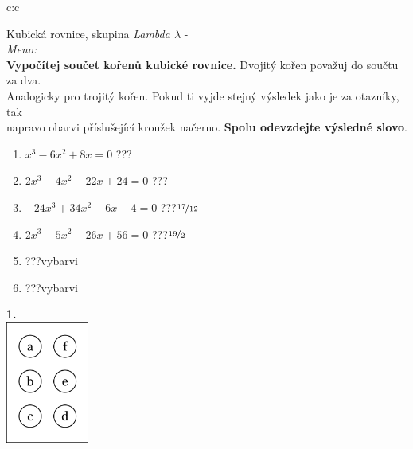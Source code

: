 \documentclass[10pt]{report}
\begin{document}
\begin{tabular}{c:c}
\begin{minipage}[c][99mm][t]{0.49\linewidth}
\begin{center}
\vspace{7mm}
{\huge Kubická rovnice, skupina \textit{Lambda $\lambda$} -}\\[4.5mm]
\textit{Meno:}\phantom{xxxxxxxxxxxxxxxxxxxxxxxxxxxxxxxxxxxxxxxxxxxxxxxxxxxxxxxxxxxxxxxxx}\\[3.5mm]
\textbf{Vypočítej součet kořenů kubické rovnice.} Dvojitý kořen považuj do součtu za dva.\\Analogicky pro trojitý kořen. Pokud ti vyjde stejný výsledek jako je za otazníky, tak\\napravo obarvi příslušející kroužek načerno. \textbf{Spolu odevzdejte výsledné slovo}.\\[3mm]
\begin{minipage}{0.77\linewidth}
\begin{center}
\begin{varwidth}{\textwidth}
\begin{enumerate}
\large
\item $x^3-6x^2+8x=0$\quad \dotfill\; ???\;\dotfill {}
\item $2x^3-4x^2-22x+24=0$\quad \dotfill\; ???\;\dotfill {}
\item $-24x^3+34x^2-6x-4=0$\quad \dotfill\; ???\;\dotfill \quad $\nicefrac{17}{12}$
\item $2x^3-5x^2-26x+56=0$\quad \dotfill\; ???\;\dotfill \quad $\nicefrac{19}{2}$
\item \quad \dotfill\; ???\;\dotfill \quad vybarvi
\item \quad \dotfill\; ???\;\dotfill \quad vybarvi
\end{enumerate}
\end{varwidth}
\end{center}
\end{minipage}
\begin{minipage}{0.20\linewidth}
\begin{center}
{\Huge\bfseries 1.} \\[2mm]
\includegraphics[height=40mm]{../images/braille.png}

\end{center}
\end{minipage}
\end{center}
\end{minipage}
\end{tabular}
\end{document}
